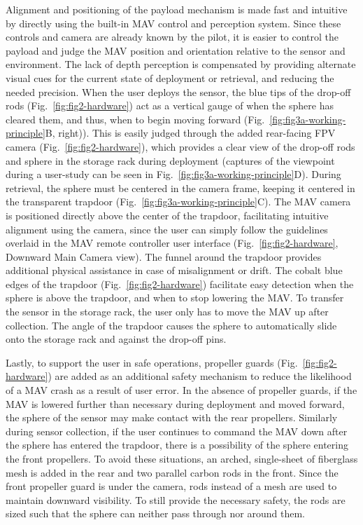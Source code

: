 Alignment and positioning of the payload mechanism is made fast and intuitive by directly using the built-in \gls{MAV} control and perception system.
Since these controls and camera are already known by the pilot, it is easier to control the payload and judge the \gls{MAV} position and orientation relative to the sensor and environment. The lack of depth perception is compensated by providing alternate visual cues for the current state of deployment or retrieval, and reducing the needed precision. When the user deploys the sensor, the blue tips of the drop-off rods (Fig.~\ref{fig:fig2-hardware}) act as a vertical gauge of when the sphere has cleared them, and thus, when to begin moving forward (Fig.~\ref{fig:fig3a-working-principle}B, right)). This is easily judged through the added rear-facing \gls{FPV} camera (Fig.~\ref{fig:fig2-hardware}), which provides a clear view of the drop-off rods and sphere in the storage rack during deployment (captures of the viewpoint during a user-study can be seen in Fig.~\ref{fig:fig3a-working-principle}D).
During retrieval, the sphere must be centered in the camera frame, keeping it centered in the transparent trapdoor (Fig.~\ref{fig:fig3a-working-principle}C). The \gls{MAV} camera is positioned directly above the center of the trapdoor, facilitating intuitive alignment using the camera, since the user can simply follow the guidelines overlaid in the \gls{MAV} remote controller user interface (Fig.~\ref{fig:fig2-hardware}, Downward Main Camera view). The funnel around the trapdoor provides additional physical assistance in case of misalignment or drift. The cobalt blue edges of the trapdoor (Fig.~\ref{fig:fig2-hardware}) facilitate easy detection when the sphere is above the trapdoor, and when to stop lowering the MAV. To transfer the sensor in the storage rack, the user only has to move the \gls{MAV} up after collection. The angle of the trapdoor causes the sphere to automatically slide onto the storage rack and against the drop-off pins.

Lastly, to support the user in safe operations, propeller guards (Fig.~\ref{fig:fig2-hardware}) are added as an additional safety mechanism to reduce the likelihood of a \gls{MAV} crash as a result of user error. In the absence of propeller guards, if the \gls{MAV} is lowered further than necessary during deployment and moved forward, the sphere of the sensor may make contact with the rear propellers. Similarly during sensor collection, if the user continues to command the \gls{MAV} down after the sphere has entered the trapdoor, there is a possibility of the sphere entering the front propellers. To avoid these situations, an arched, single-sheet of fiberglass mesh is added in the rear and two parallel carbon rods in the front. Since the front propeller guard is under the camera, rods instead of a mesh are used to maintain downward visibility. To still provide the necessary safety, the rods are sized such that the sphere can neither pass through nor around them.

